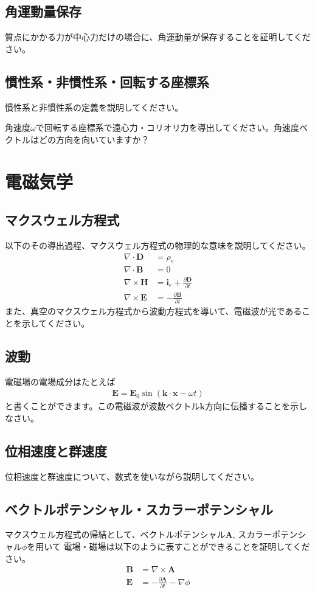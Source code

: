 \documentclass{ltjarticle}
\begin{document}
\subsection{角運動量保存}
質点にかかる力が中心力だけの場合に、角運動量が保存することを証明してください。
\subsection{慣性系・非慣性系・回転する座標系}
慣性系と非慣性系の定義を説明してください。\par
角速度$\omega$で回転する座標系で遠心力・コリオリ力を導出してください。角速度ベクトルはどの方向を向いていますか？
\section{電磁気学}
\subsection{マクスウェル方程式}
以下のその導出過程、マクスウェル方程式の物理的な意味を説明してください。
\begin{align*}
    \nabla\cdot\bm{D} &= \rho_e \\
    \nabla\cdot\bm{B} &= 0 \\
    \nabla\times\bm{H} &= \bm{i}_e + \frac{\partial \bm{D}}{\partial t} \\
    \nabla\times\bm{E} &= - \frac{\partial \bm{B}}{\partial t}
 \end{align*}
 また、真空のマクスウェル方程式から波動方程式を導いて、電磁波が光であることを示してください。
\subsection{波動}
電磁場の電場成分はたとえば
\begin{align}
    \bm{E} = \bm{E}_0 \sin\left(\bm{k}\cdot\bm{x} - \omega t\right)
\end{align}
と書くことができます。この電磁波が波数ベクトル$\bm{k}$方向に伝播することを示しなさい。
\subsection{位相速度と群速度}
位相速度と群速度について、数式を使いながら説明してください。
\subsection{ベクトルポテンシャル・スカラーポテンシャル}
マクスウェル方程式の帰結として、ベクトルポテンシャル$\bm{A}$, スカラーポテンシャル$\phi$を用いて
電場・磁場は以下のように表すことができることを証明してください。
\begin{align}
    \bm{B} &= \nabla\times \bm{A} \\
    \bm{E} &= -\frac{\partial \bm{A}}{\partial t} - \nabla \phi
\end{align}
\end{document}

